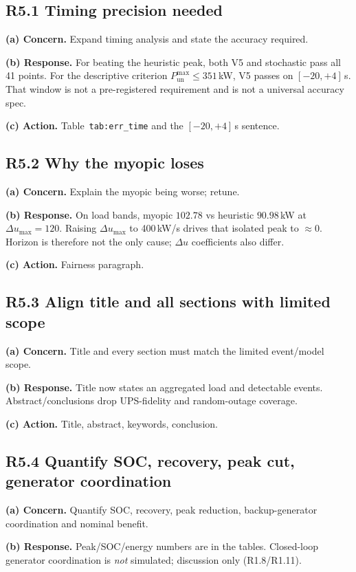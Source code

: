 \documentclass[11pt]{article}
\begin{document}
\subsection*{R5.1 Timing precision needed}
\textbf{(a) Concern.} Expand timing analysis and state the accuracy required.

\textbf{(b) Response.} For beating the heuristic peak, both V5 and stochastic pass all 41 points. For the descriptive criterion $P_{\mathrm{un}}^{\max}\le 351$\,kW, V5 passes on $[-20,+4]$\,s. That window is not a pre-registered requirement and is not a universal accuracy spec.

\textbf{(c) Action.} Table~\texttt{tab:err\_time} and the $[-20,+4]$\,s sentence.

\subsection*{R5.2 Why the myopic loses}
\textbf{(a) Concern.} Explain the myopic being worse; retune.

\textbf{(b) Response.} On load bands, myopic $102.78$ vs heuristic $90.98$\,kW at $\Delta u_{\max}=120$. Raising $\Delta u_{\max}$ to 400\,kW/s drives that isolated peak to $\approx 0$. Horizon is therefore not the only cause; $\Delta u$ coefficients also differ.

\textbf{(c) Action.} Fairness paragraph.

\subsection*{R5.3 Align title and all sections with limited scope}
\textbf{(a) Concern.} Title and every section must match the limited event/model scope.

\textbf{(b) Response.} Title now states an aggregated load and detectable events. Abstract/conclusions drop UPS-fidelity and random-outage coverage.

\textbf{(c) Action.} Title, abstract, keywords, conclusion.

\subsection*{R5.4 Quantify SOC, recovery, peak cut, generator coordination}
\textbf{(a) Concern.} Quantify SOC, recovery, peak reduction, backup-generator coordination and nominal benefit.

\textbf{(b) Response.} Peak/SOC/energy numbers are in the tables. Closed-loop generator coordination is \emph{not} simulated; discussion only (R1.8/R1.11).
\end{document}
